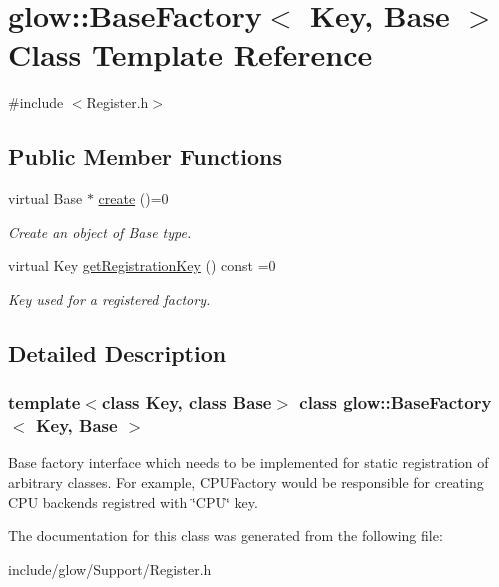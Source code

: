 \hypertarget{classglow_1_1_base_factory}{}\section{glow\+:\+:Base\+Factory$<$ Key, Base $>$ Class Template Reference}
\label{classglow_1_1_base_factory}


{\ttfamily \#include $<$Register.\+h$>$}

\subsection*{Public Member Functions}
\begin{DoxyCompactItemize}
\item 
\mbox{\label{classglow_1_1_base_factory_a63ebb087761d638c715887ebe9aa9861}} 
virtual Base $\ast$ \hyperlink{classglow_1_1_base_factory_a63ebb087761d638c715887ebe9aa9861}{create} ()=0
\begin{DoxyCompactList}\small\item\em Create an object of Base type. \end{DoxyCompactList}\item 
\mbox{\label{classglow_1_1_base_factory_a3814c70bc6638ffa9b362bb76acf2dfe}} 
virtual Key \hyperlink{classglow_1_1_base_factory_a3814c70bc6638ffa9b362bb76acf2dfe}{get\+Registration\+Key} () const =0
\begin{DoxyCompactList}\small\item\em Key used for a registered factory. \end{DoxyCompactList}\end{DoxyCompactItemize}


\subsection{Detailed Description}
\subsubsection*{template$<$class Key, class Base$>$\newline
class glow\+::\+Base\+Factory$<$ Key, Base $>$}

Base factory interface which needs to be implemented for static registration of arbitrary classes. For example, C\+P\+U\+Factory would be responsible for creating C\+PU backends registred with \char`\"{}\+C\+P\+U\char`\"{} key. 

The documentation for this class was generated from the following file\+:\begin{DoxyCompactItemize}
\item 
include/glow/\+Support/Register.\+h\end{DoxyCompactItemize}
